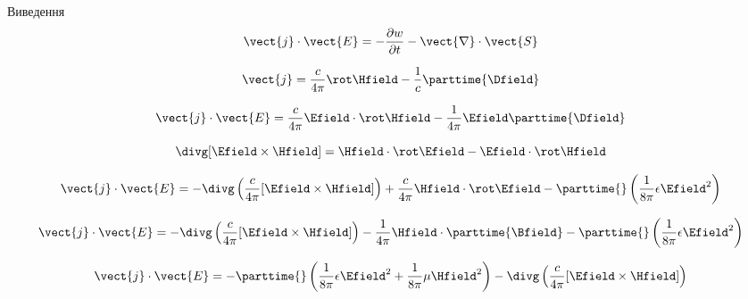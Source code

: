 \documentclass{beamer}
\begin{document}
\begin{frame}{Виведення}{}
	\begin{equation*}
		\vect{j}\cdot\vect{E} = -\frac{\partial w}{\partial t} -   \vect{\nabla}\cdot\vect{S}
	\end{equation*}

	\begin{equation*}
		\vect{j} = \frac{c}{4\pi} \rot\Hfield - \frac1c \parttime{\Dfield}
	\end{equation*}

	\begin{equation*}
		\vect{j}\cdot\vect{E} =  \frac{c}{4\pi}  \Efield\cdot \rot\Hfield - \frac1{4\pi}  \Efield \parttime{\Dfield}
	\end{equation*}

	\begin{equation*}
		\divg[\Efield\times\Hfield] = \Hfield\cdot \rot\Efield - \Efield\cdot \rot\Hfield
	\end{equation*}

	\begin{equation*}
		\vect{j}\cdot\vect{E} =  - \divg\left(\frac{c}{4\pi}[\Efield\times\Hfield]\right) + \frac{c}{4\pi}  \Hfield\cdot \rot\Efield  -   \parttime{} \left( \frac1{8\pi}\epsilon\Efield^2\right)
	\end{equation*}

	\begin{equation*}
		\vect{j}\cdot\vect{E} =  - \divg\left(\frac{c}{4\pi}[\Efield\times\Hfield]\right) - \frac{1}{4\pi}  \Hfield\cdot \parttime{\Bfield}  -   \parttime{} \left( \frac1{8\pi}\epsilon\Efield^2\right)
	\end{equation*}

	\begin{equation*}
		\vect{j}\cdot\vect{E} =  -  \parttime{} \left( \frac1{8\pi}\epsilon\Efield^2 + \frac1{8\pi}\mu\Hfield^2 \right)
		- \divg\left(\frac{c}{4\pi}[\Efield\times\Hfield]\right)
	\end{equation*}

\end{frame}
\end{document}
